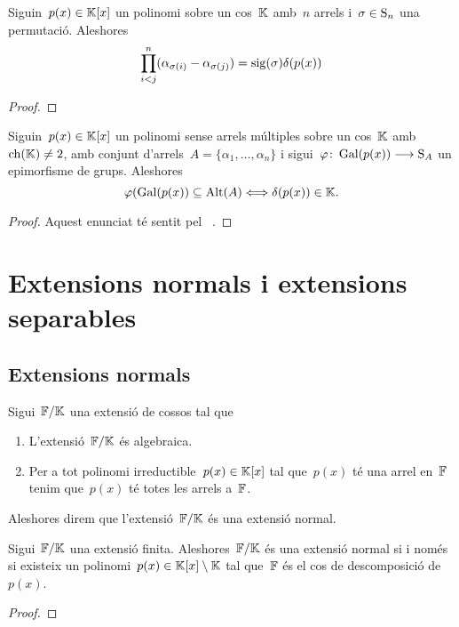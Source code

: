 \documentclass[../Apunts.tex]{subfiles}
\begin{document}
	\begin{lemma}
		\label{lema:discriminant}
		Siguin~\(p(x)\in\mathbb{K}[x]\) un polinomi sobre un cos~\(\mathbb{K}\) amb~\(n\) arrels i~\(\sigma\in\operatorname{S}_{n}\) una permutació. Aleshores
		\[\prod_{i<j}^{n}(\alpha_{\sigma(i)}-\alpha_{\sigma(j)})=\operatorname{sig}(\sigma)\delta(p(x))\]
		\begin{proof}
		\end{proof}
	\end{lemma}
	\begin{corollary}
		\label{cor:l'arrel del discriminant d'un polinomi pertany al cos si i només si el grup de Galois del polinomi és un subgrup dels alternats de les arrels}
		Siguin~\(p(x)\in\mathbb{K}[x]\) un polinomi sense arrels múltiples sobre un cos~\(\mathbb{K}\) amb~\(\operatorname{ch}(\mathbb{K})\neq2\), amb conjunt d'arrels~\(A=\{\alpha_{1},\dots,\alpha_{n}\}\) i sigui~\(\varphi\colon\operatorname{Gal}(p(x))\longrightarrow\operatorname{S}_{A}\) un epimorfisme de grups.
		Aleshores
		\[\varphi(\operatorname{Gal}(p(x))\subseteq\operatorname{Alt}(A)\Longleftrightarrow\delta(p(x))\in\mathbb{K}.\]
		\begin{proof}
			Aquest enunciat té sentit pel \corollari~.
		\end{proof}
	\end{corollary}
	
	\section{Extensions normals i extensions separables}
\subsection{Extensions normals}
	\begin{definition}
		\label{def:extensió normal}
		Sigui~\(\mathbb{F}/\mathbb{K}\) una extensió de cossos tal que
		\begin{enumerate}
			\item L'extensió~\(\mathbb{F}/\mathbb{K}\) és algebraica.
			\item Per a tot polinomi irreductible~\(p(x)\in\mathbb{K}[x]\) tal que~\(p(x)\) té una arrel en~\(\mathbb{F}\) tenim que~\(p(x)\) té totes les arrels a~\(\mathbb{F}\).
		\end{enumerate}
		Aleshores direm que l'extensió~\(\mathbb{F}/\mathbb{K}\) és una extensió normal.
	\end{definition}
	\begin{theorem}
		\label{thm:Teorema de normalitat}
		Sigui~\(\mathbb{F}/\mathbb{K}\) una extensió finita. Aleshores~\(\mathbb{F}/\mathbb{K}\) és una extensió normal si i només si existeix un polinomi~\(p(x)\in\mathbb{K}[x]\setminus\mathbb{K}\) tal que~\(\mathbb{F}\) és el cos de descomposició de~\(p(x)\).
		\begin{proof}
		\end{proof}
	\end{theorem}
\end{document}

